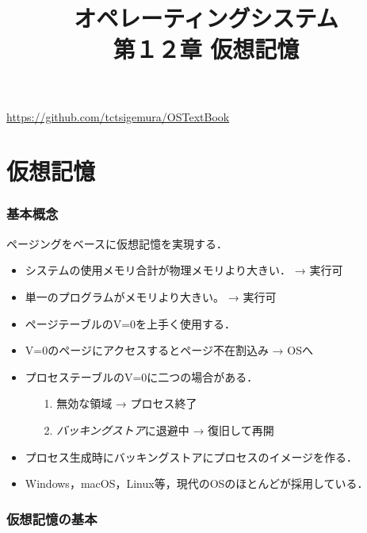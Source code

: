 \documentclass[unicode]{beamer}                   %
\begin{document}
\title[仮想記憶]{オペレーティングシステム\\第１２章 仮想記憶}
\date{}
\begin{frame}
  \titlepage
  \centerline{\url{https://github.com/tctsigemura/OSTextBook}}
\end{frame}


\section{仮想記憶}
\begin{frame}
  \frametitle{基本概念}
  ページングをベースに仮想記憶を実現する．
  \begin{itemize}
  \item システムの使用メモリ合計が物理メモリより大きい． → 実行可
  \item 単一のプログラムがメモリより大きい。 → 実行可
  \item ページテーブルのV=0を上手く使用する．
  \item V=0のページにアクセスするとページ不在割込み → OSへ
  \item プロセステーブルのV=0に二つの場合がある．
    \begin{itemize}
      \item[1.] 無効な領域 → プロセス終了
      \item[2.] \emph{バッキングストア}に退避中 → 復旧して再開
    \end{itemize}
  \item プロセス生成時にバッキングストアにプロセスのイメージを作る．
  \item Windows，macOS，Linux等，現代のOSのほとんどが採用している．
  \end{itemize}
\end{frame}

\begin{frame}
  \frametitle{仮想記憶の基本}
\end{frame}
\end{document}
